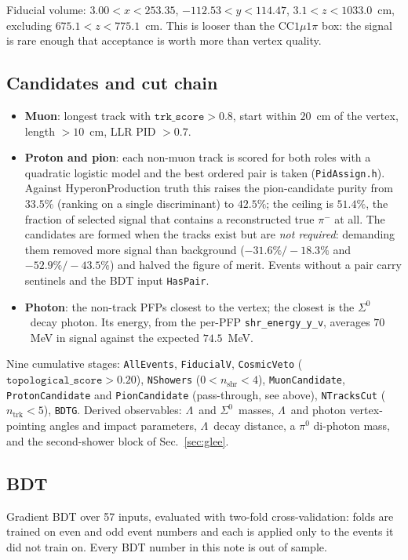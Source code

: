 \documentclass[11pt,a4paper]{article}
\newcommand{\Szero}{\ensuremath{\Sigma^{0}}}
\newcommand{\Lam}{\ensuremath{\Lambda}}
\begin{document}
Fiducial volume: $3.00 < x < 253.35$, $-112.53 < y < 114.47$, $3.1 < z < 1033.0$~cm,
excluding $675.1 < z < 775.1$~cm. This is looser than the CC$1\mu1\pi$ box: the
signal is rare enough that acceptance is worth more than vertex quality.

\subsection{Candidates and cut chain}
\begin{itemize}
  \item \textbf{Muon}: longest track with $\texttt{trk\_score}>0.8$, start within
        $20$~cm of the vertex, length $>10$~cm, LLR PID $>0.7$.
  \item \textbf{Proton and pion}: each non-muon track is scored for both roles with a
        quadratic logistic model and the best ordered pair is taken
        (\texttt{PidAssign.h}). Against HyperonProduction truth this raises the
        pion-candidate purity from $33.5\%$ (ranking on a single discriminant) to
        $42.5\%$; the ceiling is $51.4\%$, the fraction of selected signal that
        contains a reconstructed true $\pi^-$ at all. The candidates are formed when
        the tracks exist but are \emph{not required}: demanding them removed more signal
        than background ($-31.6\%/-18.3\%$ and $-52.9\%/-43.5\%$) and halved the figure
        of merit. Events without a pair carry sentinels and the BDT input
        \texttt{HasPair}.
  \item \textbf{Photon}: the non-track PFPs closest to the vertex; the closest is the
        \Szero\ decay photon. Its energy, from the per-PFP \texttt{shr\_energy\_y\_v},
        averages $70$~MeV in signal against the expected $74.5$~MeV.
\end{itemize}
Nine cumulative stages: \texttt{AllEvents}, \texttt{FiducialV},
\texttt{CosmicVeto} ($\texttt{topological\_score}>0.20$), \texttt{NShowers}
($0<n_{\mathrm{shr}}<4$), \texttt{MuonCandidate}, \texttt{ProtonCandidate} and
\texttt{PionCandidate} (pass-through, see above), \texttt{NTracksCut}
($n_{\mathrm{trk}}<5$), \texttt{BDTG}. Derived observables: \Lam\ and \Szero\
masses, \Lam\ and photon vertex-pointing angles and impact parameters, \Lam\ decay
distance, a $\pi^0$ di-photon mass, and the second-shower block of
Sec.~\ref{sec:glee}.

\subsection{BDT}
\label{sec:bdt}
Gradient BDT over 57 inputs, evaluated with two-fold cross-validation: folds are
trained on even and odd event numbers and each is applied only to the events it did
not train on. Every BDT number in this note is out of sample.
\end{document}
